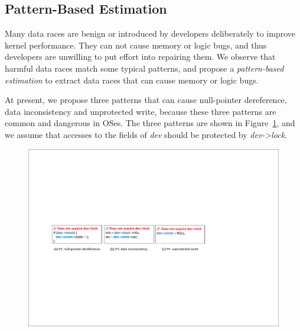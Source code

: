 \subsection{Pattern-Based Estimation}
\label{subsec_estimation}
Many data races are benign or introduced by developers deliberately to improve 
kernel performance. They can not cause memory or logic bugs, and thus 
developers are unwilling to put effort into repairing them. We observe that 
harmful data races match some typical patterns, and propose a {\em 
pattern-based estimation} to extract data races that can cause memory or logic 
bugs.

At present, we propose three patterns that can cause null-pointer dereference, 
data inconsistency and unprotected write, because these three patterns are 
common and dangerous in OSes. The three patterns are shown in 
Figure~\ref{fig_pattern}, and we assume that accesses to the fields of {\em 
dev} should be protected by {\em dev->lock}.

\begin{figure}[htbp]
	\centering
	\includegraphics[width=1\linewidth]{figures/fig_pattern.pdf}
	\label{fig_pattern}
\end{figure}

